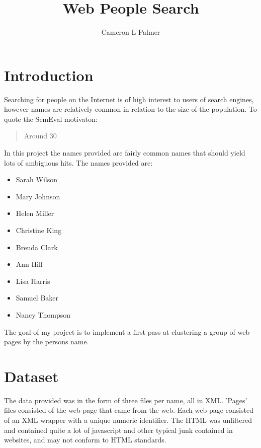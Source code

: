 \documentclass[12pt,twoside,letterpaper]{article}
\title{Web People Search}
\author{Cameron L Palmer}
\begin{document}
\maketitle
\thispagestyle{empty}
\newpage
\pagestyle{plain}
\section{Introduction}

Searching for people on the Internet is of high interest to users of search engines, however names are relatively common in relation to the size of the population. To quote the SemEval motivaton:

\begin{quote}
Around 30%
\end{quote}

In this project the names provided are fairly common names that should yield lots of ambiguous hits. The names provided are:
\begin{itemize}
\item Sarah Wilson
\item Mary Johnson
\item Helen Miller
\item Christine King
\item Brenda Clark
\item Ann Hill
\item Lisa Harris
\item Samuel Baker
\item Nancy Thompson
\end{itemize}

The goal of my project is to implement a first pass at clustering a group of web pages by the persons name.

\section{Dataset}

The data provided was in the form of three files per name, all in XML. 'Pages' files consisted of the web page that came from the web. Each web page consisted of an XML wrapper with a unique numeric identifier. The HTML was unfiltered and contained quite a lot of javascript and other typical junk contained in websites, and may not conform to HTML standards.
\end{document}
